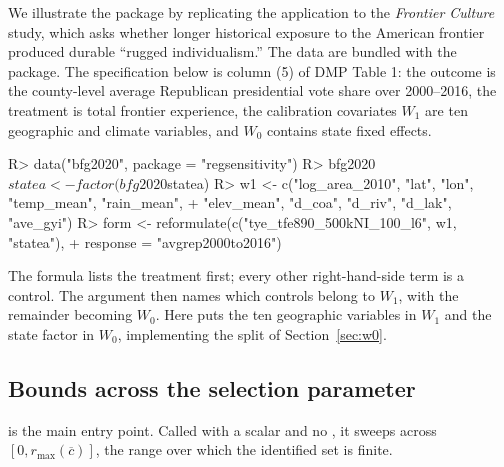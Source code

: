 \documentclass[article]{jss}\usepackage[]{graphicx}\usepackage[]{xcolor}
\newcommand{\cbar}{\ensuremath{\overline{c}}}
\begin{document}
We illustrate the package by replicating the \citet{Diegert2026}
application to the \citet{BFG2020} \emph{Frontier Culture} study, which
asks whether longer historical exposure to the American frontier produced
durable ``rugged individualism.'' The data are bundled with the package.
The specification below is column (5) of DMP Table 1: the outcome is the
county-level average Republican presidential vote share over
2000--2016, the treatment is total frontier experience, the calibration
covariates $W_1$ are ten geographic and climate variables, and $W_0$
contains state fixed effects.

\begin{Schunk}
\begin{Sinput}
R> data("bfg2020", package = "regsensitivity")
R> bfg2020$statea <- factor(bfg2020$statea)
R> w1 <- c("log_area_2010", "lat", "lon", "temp_mean", "rain_mean",
+          "elev_mean", "d_coa", "d_riv", "d_lak", "ave_gyi")
R> form <- reformulate(c("tye_tfe890_500kNI_100_l6", w1, "statea"),
+                      response = "avgrep2000to2016")
\end{Sinput}
\end{Schunk}

The formula lists the treatment first; every other right-hand-side term is
a control. The  argument then names which controls belong to
$W_1$, with the remainder becoming $W_0$. Here  puts
the ten geographic variables in $W_1$ and the state factor in $W_0$,
implementing the split of Section~\ref{sec:w0}.

\subsection{Bounds across the selection parameter}\label{sec:api-bounds}

 is the main entry point. Called with a scalar
 and no , it sweeps  across
$[0, r_{\max}(\cbar)]$, the range over which the identified set is finite.
\end{document}
